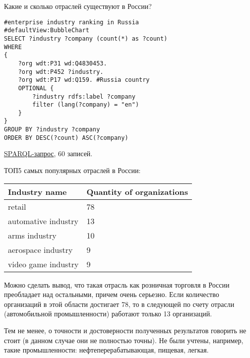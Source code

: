 Какие и сколько отраслей существуют в России? 

\begin{lstlisting}[language=SPARQL]
#enterprise industry ranking in Russia
#defaultView:BubbleChart
SELECT ?industry ?company (count(*) as ?count) 
WHERE 
{
    ?org wdt:P31 wd:Q4830453.
    ?org wdt:P452 ?industry.
    ?org wdt:P17 wd:Q159. #Russia country
    OPTIONAL {
		?industry rdfs:label ?company
		filter (lang(?company) = "en")
	}
}
GROUP BY ?industry ?company
ORDER BY DESC(?count) ASC(?company)
\end{lstlisting}

\href{https://query.wikidata.org/#%23enterprise%20industry%20ranking%0A%23defaultView%3ABubbleChart%0ASELECT%20%3Findustry%20%3Fcompany%20%28count%28%2a%29%20as%20%3Fcount%29%20%0AWHERE%20%0A%7B%0A%20%20%20%20%3Forg%20wdt%3AP31%20wd%3AQ4830453.%0A%20%20%20%20%3Forg%20wdt%3AP452%20%3Findustry%20.%0A%20%20%20%20%3Forg%20wdt%3AP17%20wd%3AQ159.%20%23Russia%20country%0A%20%20%20%20OPTIONAL%20%7B%0A%09%09%3Findustry%20rdfs%3Alabel%20%3Fcompany%0A%09%09filter%20%28lang%28%3Fcompany%29%20%3D%20%22en%22%29%0A%09%7D%0A%7D%0AGROUP%20BY%20%3Findustry%20%3Fcompany%0AORDER%20BY%20DESC%28%3Fcount%29%20ASC%28%3Fcompany%29%0A}{SPARQL-запрос}, 60 записей.

ТОП5 самых популярных отраслей в России: \\
\begin{tabular}{|l|l|}
\hline
\textbf{Industry name} & \textbf{Quantity of organizations} \\
\hline
retail & 78 \\
\hline
automative industry & 13 \\	
\hline
arms industry & 10 \\
\hline
aerospace industry & 9 \\
\hline
video game industry & 9 \\
\hline
\end{tabular}

Можно сделать вывод, что такая отрасль как розничная торговля в России преобладает над остальными, причем очень серьезно. Если количество организаций в этой области достигает 78, то в следующей по счету отрасли (автомобильной промышленности) работают только 13 организаций. 

Тем не менее, о точности и достоверности полученных результатов говорить не стоит (в данном случае они не полностью точны). Не были учтены, например, такие промышленности: нефтеперерабатывающая, пищевая, легкая.

